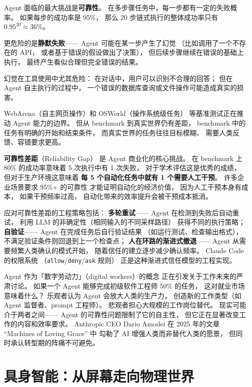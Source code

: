 Agent 面临的最大挑战是\textbf{可靠性}。
在多步骤任务中，每一步都有一定的失败概率。
如果每步的成功率是 95\%，
那么 20 步链式执行的整体成功率只有 $0.95^{20} \approx 36\%$。

更危险的是\textbf{静默失败}——
Agent 可能在某一步产生了幻觉
（比如调用了一个不存在的 API，
或者基于错误的假设做出了决策），
但后续步骤继续在错误的基础上执行，
最终产生看似合理但完全错误的结果。

幻觉在工具使用中尤其危险：
在对话中，用户可以识别不合理的回答；
但在 Agent 自主执行的过程中，
一个错误的数据库查询或文件操作可能造成真实的损害。

WebArena（自主网页操作）和 OSWorld（操作系统级任务）
等基准测试正在推动 Agent 能力的边界。
但从 benchmark 到真实世界仍有差距，
benchmark 中的任务有明确的开始和结束条件，
而真实世界的任务往往目标模糊、
需要人类反馈、容错要求更高。

\textbf{可靠性差距}（Reliability Gap）
是 Agent 商业化的核心挑战。
在 benchmark 上 80\% 的成功率意味着
5 次执行中有 1 次失败，
对于学术评估这是优秀的成绩，
但对于生产环境这意味着
\textbf{每 5 个自动化任务中就有 1 个需要人工干预}。
许多企业场景要求 95\%+ 的可靠性
才能证明自动化的经济价值，
因为人工干预本身有成本，
如果干预频率过高，
自动化带来的效率提升会被干预成本抵消。

应对可靠性差距的工程策略包括：
\textbf{多轮重试}——
Agent 在检测到失败后自动重试，
利用 LLM 的非确定性（相同输入的不同采样路径）
获得不同的执行策略；
\textbf{自验证}——
Agent 在完成任务后自行验证结果
（如运行测试、检查输出格式），
不满足验证条件则回退到上一个检查点；
\textbf{人在环路的渐进式撤退}——
Agent 从需要频繁人类确认的模式开始，
随着信任的建立逐步减少确认频率。
Claude Code 的权限系统
（\texttt{allow}/\texttt{deny}/\texttt{ask} 规则）
正是这种渐进式信任模型的工程实现。

\begin{warnbox}
Agent 作为「数字劳动力」（digital workers）的概念
正在引发关于工作未来的严肃讨论。
如果一个 Agent 能够完成初级软件工程师 50\% 的任务，
这对就业市场意味着什么？
乐观者认为 Agent 会放大人类的生产力，
创造新的工作类型（如 Agent 监督者、prompt 工程师）。
悲观者担心大规模的工作岗位替代。
现实可能介于两者之间——
Agent 的可靠性问题限制了它的自主性，
但它正在显著改变工作的内容和效率要求。
Anthropic CEO Dario Amodei 在 2025 年的文章
“Machines of Loving Grace” 中
勾勒了 AI 增强人类而非替代人类的愿景，
但同时承认转型期的阵痛不可避免。
\end{warnbox}

\section{具身智能：从屏幕走向物理世界}
\label{sec:embodied-ai}


